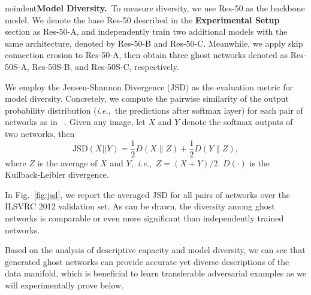 \documentclass[letterpaper]{article} %
\newcommand{\citet}[1]{\citeauthor{#1} \shortcite{#1}}
\def\ie{\emph{i.e.}}
\begin{document}
noindent\textbf{Model Diversity.}~To measure diversity, we use Res-50 as the backbone model. We denote the base Res-50 described in the \textbf{Experimental Setup} section as Res-50-A, and independently train two additional models with the same architecture, denoted by Res-50-B and Res-50-C. Meanwhile, we apply skip connection erosion to Res-50-A, then obtain three ghost networks denoted as Res-50S-A, Res-50S-B, and Res-50S-C, respectively.%

We employ the Jensen-Shannon Divergence (JSD) as the evaluation metric for model diversity. Concretely, we compute the pairwise similarity of the output probability distribution (\ie,~the predictions after softmax layer) for each pair of networks as in~\citet{huang2017snapshot}. Given any image, let $X$ and $Y$ denote the softmax outputs of two networks, then
\begin{equation}
\text{JSD}(X||Y)=\frac{1}{2}D(X\|Z)+\frac{1}{2}D(Y\|Z),
\end{equation}
where $Z$ is the average of $X$ and $Y$,~\ie,~$Z=(X+Y)/2$. $D(\cdot)$ is the Kullback-Leibler divergence.

In Fig.~\ref{fig:jsd}, we report the averaged JSD for all pairs of networks over the ILSVRC 2012 validation set. As can be drawn, the diversity among ghost networks is comparable or even more significant than independently trained networks.


Based on the analysis of descriptive capacity and model diversity, we can see that generated ghost networks can provide accurate yet diverse descriptions of the data manifold, which is beneficial to learn transferable adversarial examples as we will experimentally prove below.
\end{document}
